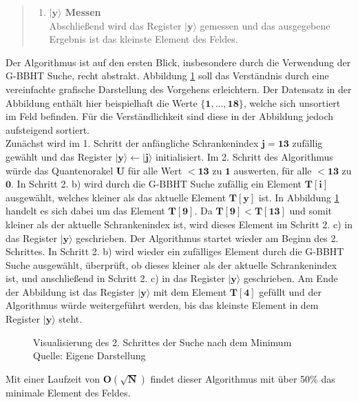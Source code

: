 \begin{quote}
\begin{enumerate}
		\item \textbf{$\mathbf{|y\rangle}$ Messen}
		\\
		Abschließend wird das Register $\mathbf{|y\rangle}$ gemessen und das ausgegebene Ergebnis ist das kleinste Element des Feldes.
	\end{enumerate}
\end{quote}

Der Algorithmus ist auf den ersten Blick, insbesondere durch die Verwendung der G-BBHT Suche, recht abstrakt. 
Abbildung \ref{fig:sucheMinimumVisualisierung} soll das Verständnis durch eine vereinfachte grafische Darstellung des Vorgehens erleichtern. 
Der Datensatz in der Abbildung enthält hier beispielhaft die Werte $\mathbf{\{1, ..., 18\}}$, welche sich unsortiert im Feld befinden. Für die Verständlichkeit sind diese in der Abbildung jedoch aufsteigend sortiert.
\\
Zunächst wird im 1. Schritt der anfängliche Schrankenindex $\mathbf{j = 13}$ zufällig gewählt und das Register $\mathbf{|y\rangle \leftarrow |j\rangle}$ initialisiert. 
Im 2. Schritt des Algorithmus würde das Quantenorakel $\mathbf{U}$ für alle Wert $\mathbf{< 13}$ zu $\mathbf{1}$ auswerten, für alle $\mathbf{< 13}$ zu $\mathbf{0}$.
In Schritt 2. b) wird durch die G-BBHT Suche zufällig ein Element $\mathbf{T[i]}$ ausgewählt, welches kleiner als das aktuelle Element $\mathbf{T[y]}$ ist. 
In Abbildung \ref{fig:sucheMinimumVisualisierung} handelt es sich dabei um das Element $\mathbf{T[9]}$.
Da $\mathbf{T[9] < T[13]}$ und somit kleiner als der aktuelle Schrankenindex ist, wird dieses Element im Schritt 2. c) in das Register $\mathbf{|y\rangle}$ geschrieben.
Der Algorithmus startet wieder am Beginn des 2. Schrittes. In Schritt 2. b) wird wieder ein zufälliges Element durch die G-BBHT Suche ausgewählt, überprüft, ob dieses kleiner als der aktuelle Schrankenindex ist, und anschließend in Schritt 2. c) in das Register $\mathbf{|y\rangle}$ geschrieben.
Am Ende der Abbildung ist das Register $\mathbf{|y\rangle}$ mit dem Element $\mathbf{T[4]}$ gefüllt und der Algorithmus würde weitergeführt werden, bis das kleinste Element in dem Register $\mathbf{|y\rangle}$ steht.
\begin{figure}[hbtp]
	\centering
	\caption{Visualisierung des 2. Schrittes der Suche nach dem Minimum \\ Quelle: Eigene Darstellung}
	\label{fig:sucheMinimumVisualisierung}
\end{figure} 

Mit einer Laufzeit von $\mathbf{O(\sqrt{N})}$ findet dieser Algorithmus mit über 50\% das minimale Element des Feldes.
